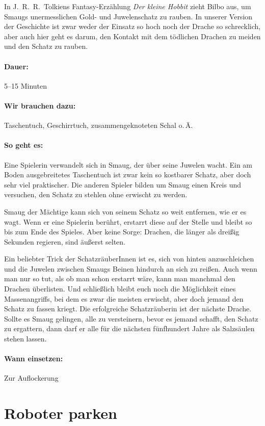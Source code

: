 In J.~R.~R.~Tolkiens Fantasy-Erzählung \emph{Der kleine Hobbit} zieht Bilbo aus, um Smaugs unermesslichen Gold- und Juwelenschatz zu rauben. In unserer Version der Geschichte ist zwar weder der Einsatz so hoch noch der Drache so schrecklich, aber auch hier geht es darum, den Kontakt mit dem tödlichen Drachen zu meiden und den Schatz zu rauben.
\paragraph{Dauer:} 5--15 Minuten
\paragraph{Wir brauchen dazu:} Taschentuch, Geschirrtuch, zusammengeknoteten Schal o.\,Ä.
\paragraph{So geht es:}
Eine Spielerin verwandelt sich in Smaug, der über seine Juwelen wacht. Ein am Boden ausgebreitetes Taschentuch ist zwar kein so kostbarer Schatz, aber doch sehr viel praktischer. Die anderen Spieler bilden um Smaug einen Kreis und versuchen, den Schatz zu stehlen ohne erwischt zu werden.

Smaug der Mächtige kann sich von seinem Schatz so weit entfernen, wie er es wagt. Wenn er eine Spielerin berührt, erstarrt diese auf der Stelle und bleibt so bis zum Ende des Spieles. Aber keine Sorge: Drachen, die länger als dreißig Sekunden regieren, sind äußerst selten.

Ein beliebter Trick der SchatzräuberInnen ist es, sich von hinten anzuschleichen und die Juwelen zwischen Smaugs Beinen hindurch an sich zu reißen. Auch wenn man nur so tut, als ob man schon erstarrt wäre, kann man manchmal den Drachen überlisten. Und schließlich bleibt euch noch die Möglichkeit eines Massenangriffs, bei dem es zwar die meisten erwischt, aber doch jemand den Schatz zu fassen kriegt. Die erfolgreiche Schatzräuberin ist der nächste Drache. Sollte es Smaug gelingen, alle zu versteinern, bevor es jemand schafft, den Schatz zu ergattern, dann darf er alle für die nächsten fünfhundert Jahre als Salzsäulen stehen lassen.
\paragraph{Wann einsetzen:} Zur Auflockerung

\section{Roboter parken}

